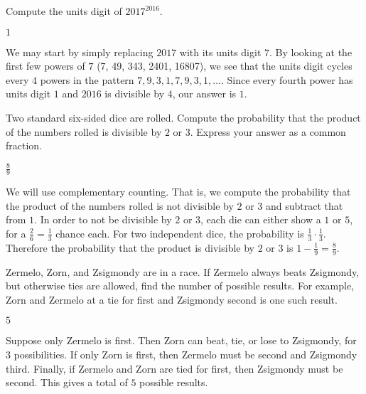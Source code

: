 \documentclass[11pt]{article}
\begin{document}
\begin{problem}
Compute the units digit of $2017^{2016}$.
\end{problem}

\begin{answer}
$\boxed{1}$
\end{answer}

\begin{solution}
We may start by simply replacing $2017$ with its units digit $7$. By looking at the first few powers of $7$ (7, 49, 343, 2401, 16807), we see that the units digit cycles every $4$ powers in the pattern $7, 9, 3, 1, 7, 9, 3, 1, \ldots$. Since every fourth power has units digit $1$ and $2016$ is divisible by $4$, our answer is $\boxed{1}$.
\end{solution}


\begin{problem}
Two standard six-sided dice are rolled. Compute the probability that the product of the numbers rolled is divisible by $2$ or $3$. Express your answer as a common fraction.
\end{problem}

\begin{answer} %
$\boxed{\frac{8}{9}}$
\end{answer}

\begin{solution}
We will use complementary counting. That is, we compute the probability that the product of the numbers rolled is not divisible by $2$ or $3$ and subtract that from $1$. In order to not be divisible by $2$ or $3$, each die can either show a $1$ or $5$, for a $\frac{2}{6} = \frac{1}{3}$ chance each. For two independent dice, the probability is $\frac{1}{3} \cdot \frac{1}{3}$. Therefore the probability that the product is divisible by $2$ or $3$ is $1 - \frac{1}{9} = \boxed{\frac{8}{9}}$.
\end{solution}


\begin{problem}
Zermelo, Zorn, and Zsigmondy are in a race. If Zermelo always beats Zsigmondy, but otherwise ties are allowed, find the number of possible results. For example, Zorn and Zermelo at a tie for first and Zsigmondy second is one such result.
\end{problem}

\begin{answer}
$\boxed{5}$
\end{answer}

\begin{solution}
Suppose only Zermelo is first. Then Zorn can beat, tie, or lose to Zsigmondy, for $3$ possibilities. If only Zorn is first, then Zermelo must be second and Zsigmondy third. Finally, if Zermelo and Zorn are tied for first, then Zsigmondy must be second. This gives a total of $\boxed{5}$ possible results.
\end{solution}
\end{document}
